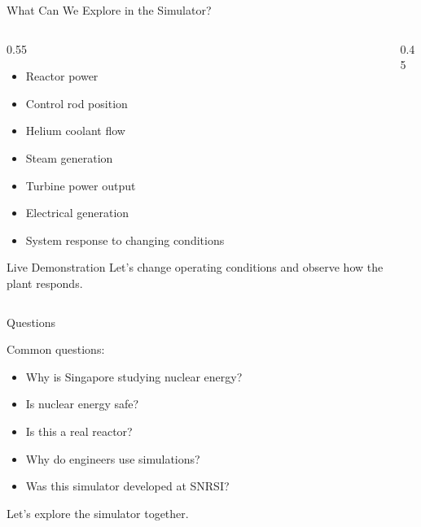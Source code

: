 \documentclass[aspectratio=169]{beamer}
\begin{document}
\begin{frame}{What Can We Explore in the Simulator?}

\begin{columns}

\begin{column}{0.55\textwidth}

\begin{itemize}
\item Reactor power
\item Control rod position
\item Helium coolant flow
\item Steam generation
\item Turbine power output
\item Electrical generation
\item System response to changing conditions
\end{itemize}

\vspace{0.5cm}

\begin{alertblock}{Live Demonstration}
Let's change operating conditions and observe how the plant responds.
\end{alertblock}

\end{column}

\begin{column}{0.45\textwidth}

\centering


\end{column}

\end{columns}

\end{frame}

\begin{frame}{Questions}

\Large

Common questions:

\begin{itemize}
\item Why is Singapore studying nuclear energy?
\item Is nuclear energy safe?
\item Is this a real reactor?
\item Why do engineers use simulations?
\item Was this simulator developed at SNRSI?
\end{itemize}

\vspace{1cm}

\centering
\Large
Let's explore the simulator together.

\end{frame}
\end{document}
